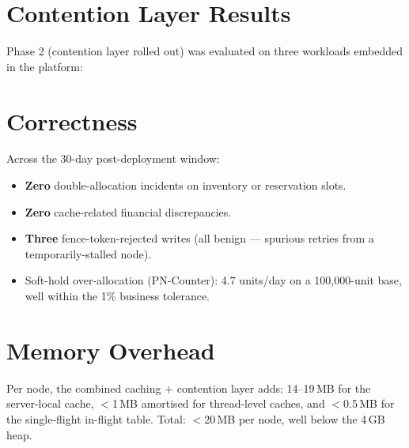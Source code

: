 \section{Contention Layer Results}
Phase 2 (contention layer rolled out) was evaluated on three workloads embedded in the platform:

\begin{table}[h]
\centering
\footnotesize
\setlength{\tabcolsep}{5pt}
\renewcommand{\arraystretch}{1.15}
\caption{Contention layer performance per workload (30-day production averages).}
\label{tab:contention}
\end{table}

\section{Correctness}
Across the 30-day post-deployment window:
\begin{itemize}[leftmargin=*]
    \item \textbf{Zero} double-allocation incidents on inventory or reservation slots.
    \item \textbf{Zero} cache-related financial discrepancies.
    \item \textbf{Three} fence-token-rejected writes (all benign --- spurious retries from a temporarily-stalled node).
    \item Soft-hold over-allocation (PN-Counter): 4.7 units/day on a 100{,}000-unit base, well within the 1\% business tolerance.
\end{itemize}

\section{Memory Overhead}
Per node, the combined caching + contention layer adds: 14--19\,MB for the server-local cache, $<$1\,MB amortised for thread-level caches, and $<$0.5\,MB for the single-flight in-flight table. Total: $<$20\,MB per node, well below the 4\,GB heap.

